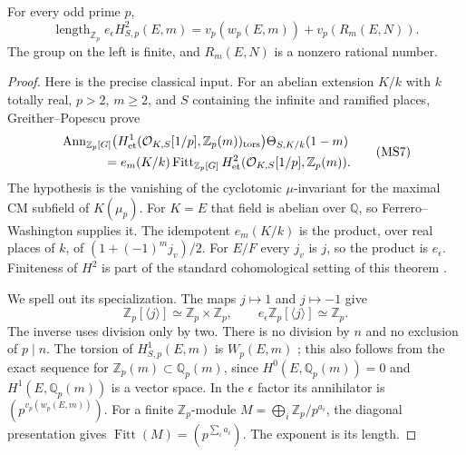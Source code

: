 \begin{proposition}\label{ms-special-value}
For every odd prime $p$,
\[
 \operatorname{length}_{\mathbb Z_p}
                    e_\epsilon H^2_{S,p}(E,m)
       =v_p(w_p(E,m))+v_p(R_m(E,N)).
 \tag{MS6}
\]
The group on the left is finite, and $R_m(E,N)$ is a
nonzero rational number.
\end{proposition}
\begin{proof}
Here is the precise classical input.
For an abelian extension $K/k$ with $k$ totally real,
$p>2$, $m\ge2$, and $S$ containing the infinite and
ramified places, Greither--Popescu
\cite[Theorem 6.11]{greither-popescu} prove
\[
 \begin{split}
 &\operatorname{Ann}_{\mathbb Z_p[G]}
     \bigl(H^1_{\mathrm{et}}(\mathcal O_{K,S}[1/p],
                             \mathbb Z_p(m))_{\mathrm{tors}}\bigr)
                       \Theta_{S,K/k}(1-m)\\
 &\hspace{12mm}=
 e_m(K/k)\operatorname{Fitt}_{\mathbb Z_p[G]}
             H^2_{\mathrm{et}}(\mathcal O_{K,S}[1/p],\mathbb Z_p(m)).
 \end{split}
 \tag{MS7}
\]
The hypothesis is the vanishing of the cyclotomic
$\mu$-invariant for the maximal CM subfield of $K(\mu_p)$.
For $K=E$ that field is abelian over $\mathbb Q$, so
Ferrero--Washington \cite{ct-fw} supplies it.
The idempotent $e_m(K/k)$ is the product, over real places
of $k$, of $(1+(-1)^m j_v)/2$.  For $E/F$ every $j_v$
is $j$, so the product is $e_\epsilon$.
Finiteness of $H^2$ is part of the standard cohomological
setting of this theorem
\cite[\S6.2, preceding Lemma 6.9]{greither-popescu}.

We spell out its specialization.  The maps $j\mapsto1$
and $j\mapsto-1$ give
\[
 \mathbb Z_p[\langle j\rangle]\simeq
                       \mathbb Z_p\times\mathbb Z_p,
 \qquad
 e_\epsilon\mathbb Z_p[\langle j\rangle]\simeq\mathbb Z_p.
 \tag{MS8}
\]
The inverse uses division only by two.  There is no
division by $n$ and no exclusion of $p\mid n$.
The torsion of $H^1_{S,p}(E,m)$ is $W_p(E,m)$
\cite[Lemma 6.9(1)]{greither-popescu}; this also follows
from the exact sequence for
$\mathbb Z_p(m)\subset\mathbb Q_p(m)$, since
$H^0(E,\mathbb Q_p(m))=0$ and $H^1(E,\mathbb Q_p(m))$
is a vector space.
In the $\epsilon$ factor its annihilator is
$(p^{v_p(w_p(E,m))})$.
For a finite $\mathbb Z_p$-module
$M=\bigoplus_i\mathbb Z_p/p^{a_i}$, the diagonal presentation
gives $\operatorname{Fitt}(M)=(p^{\sum_i a_i})$.
The exponent is its length.


\end{proof}

